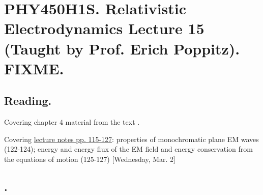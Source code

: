 
%

\chapter{PHY450H1S.  Relativistic Electrodynamics Lecture 15 (Taught by Prof. Erich Poppitz).  FIXME.}
\label{chap:relativisticElectrodynamicsL16}
{}
\date{Mar 2, 2011}

\beginArtNoToc

\section{Reading.}

Covering chapter 4 material from the text \cite{landau1980classical}.

Covering \href{http://www.physics.utoronto.ca/~poppitz/e-poppitz/PHY450_files/RelEMpp115-127.pdf}{lecture notes pp. 115-127}: properties of monochromatic plane EM waves (122-124); energy and energy flux of the EM field and energy conservation from the equations of motion (125-127)  [Wednesday, Mar. 2]

\section{.}

\EndArticle
